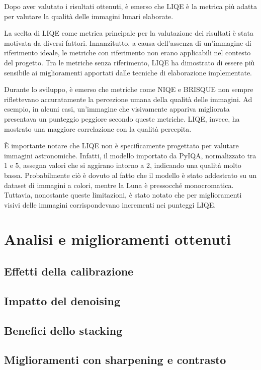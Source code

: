 Dopo aver valutato i risultati ottenuti, è emerso che LIQE è la metrica più adatta per valutare la qualità delle immagini lunari elaborate.

La scelta di LIQE come metrica principale per la valutazione dei risultati è stata motivata da diversi fattori. Innanzitutto, a causa dell'assenza di un'immagine di riferimento ideale, le metriche con riferimento non erano applicabili nel contesto del progetto. Tra le metriche senza riferimento, LIQE ha dimostrato di essere più sensibile ai miglioramenti apportati dalle tecniche di elaborazione implementate.

Durante lo sviluppo, è emerso che metriche come NIQE e BRISQUE non sempre riflettevano accuratamente la percezione umana della qualità delle immagini. Ad esempio, in alcuni casi, un'immagine che visivamente appariva migliorata presentava un punteggio peggiore secondo queste metriche. LIQE, invece, ha mostrato una maggiore correlazione con la qualità percepita.

È importante notare che LIQE non è specificamente progettato per valutare immagini astronomiche. Infatti, il modello importato da PyIQA, normalizzato tra 1 e 5, assegna valori che si aggirano intorno a 2, indicando una qualità molto bassa. Probabilmente ciò è dovuto al fatto che il modello è stato addestrato su un dataset di immagini a colori, mentre la Luna è pressocché monocromatica. Tuttavia, nonostante queste limitazioni, è stato notato che per miglioramenti visivi delle immagini corrispondevano incrementi nei punteggi LIQE.

\section{Analisi e miglioramenti ottenuti} \label{sec:analysis}

\subsection{Effetti della calibrazione} \label{subsec:analysis_cal}

\subsection{Impatto del denoising} \label{subsec:analysis_den}

\subsection{Benefici dello stacking} \label{subsec:analysis_stack}

\subsection{Miglioramenti con sharpening e contrasto} \label{subsec:analisys_post}

\cleardoublepage
